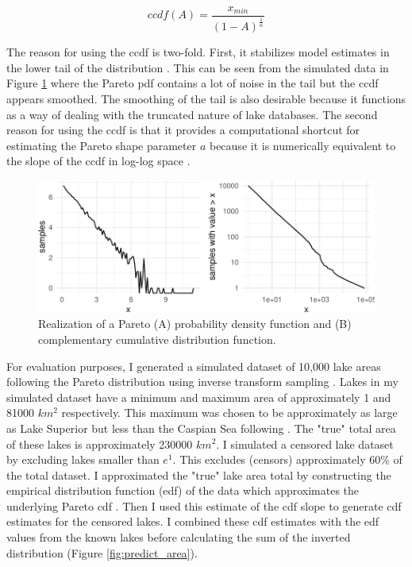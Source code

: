 \documentclass{article}
\begin{document}
\begin{equation}
    ccdf(A) = \frac{x_{min}}{(1-A)^{\frac{1}{\alpha}}}
  \label{eqn:pareto_ccdf}
\end{equation}

The reason for using the ccdf is two-fold. First, it stabilizes model estimates in the lower tail of the distribution \citep{newman_power_2005}. This can be seen from the simulated data in Figure \ref{fig:pareto_demo} where the Pareto pdf contains a lot of noise in the tail but the ccdf appears smoothed. The smoothing of the tail is also desirable because it functions as a way of dealing with the truncated nature of lake databases. The second reason for using the ccdf is that it provides a computational shortcut for estimating the Pareto shape parameter $a$ because it is numerically equivalent to the slope of the ccdf in log-log space \citep{downingGlobalAbundanceSize2006}.

\begin{figure}
	\centering
	\includegraphics{figures/pareto_demo-1}
	\caption{Realization of a Pareto (A) probability density function and (B) complementary cumulative distribution function.}
	\label{fig:pareto_demo}
\end{figure}

For evaluation purposes, I generated a simulated dataset of 10,000 lake areas following the Pareto distribution using inverse transform sampling \citep{newman_power_2005}. Lakes in my simulated dataset have a minimum and maximum area of approximately 1 and 81000 $km^2$ respectively. This maximum was chosen to be approximately as large as Lake Superior but less than the Caspian Sea following \citet{lehnerDevelopmentValidationGlobal2004}. The "true" total area of these lakes is approximately 230000 $km^2$. I simulated a censored lake dataset by excluding lakes smaller than $e^{1}$. This excludes (censors) approximately 60\% of the total dataset. I approximated the "true" lake area total by constructing the empirical distribution function (edf) of the data which approximates the underlying Pareto cdf \citep{newman_power_2005}. Then I used this estimate of the cdf slope to generate cdf estimates for the censored lakes. I combined these cdf estimates with the edf values from the known lakes before calculating the sum of the inverted distribution (Figure \ref{fig:predict_area}).
\end{document}
